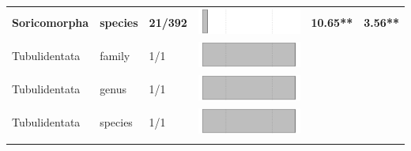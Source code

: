 \begin{longtable}{lL{1.8cm}C{2cm}lcc}
  \textbf{Soricomorpha} & \textbf{species} & \textbf{21/392} & \includegraphics[width=0.20\linewidth, height=0.05\linewidth]{Results_1c/Table_figures/bar81.pdf} & \textbf{10.65**} & \textbf{3.56**} \\ 
  Tubulidentata & family & 1/1 & \includegraphics[width=0.20\linewidth, height=0.05\linewidth]{Results_1c/Table_figures/bar82.pdf} &   &   \\ 
  Tubulidentata & genus & 1/1 & \includegraphics[width=0.20\linewidth, height=0.05\linewidth]{Results_1c/Table_figures/bar83.pdf} &   &   \\ 
  Tubulidentata & species & 1/1 & \includegraphics[width=0.20\linewidth, height=0.05\linewidth]{Results_1c/Table_figures/bar84.pdf} &   &   \\ 
   \hline
\hline
\label{Table_results}
\end{longtable}
